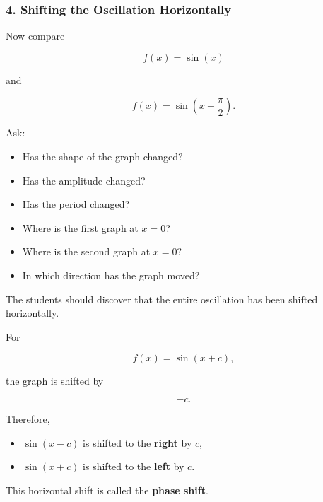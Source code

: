 \documentclass[a4paper,11pt]{article}
\begin{document}
\subsubsection*{4. Shifting the Oscillation Horizontally}

Now compare

\begin{equation}
    f(x)=\sin(x)
\end{equation}

and

\begin{equation}
    f(x)=\sin\left(x-\frac{\pi}{2}\right).
\end{equation}

Ask:

\begin{itemize}
    \item Has the shape of the graph changed?
    \item Has the amplitude changed?
    \item Has the period changed?
    \item Where is the first graph at $x=0$?
    \item Where is the second graph at $x=0$?
    \item In which direction has the graph moved?
\end{itemize}

The students should discover that the entire oscillation has been
shifted horizontally.

For

\begin{equation}
    f(x)=\sin(x+c),
\end{equation}

the graph is shifted by

\begin{equation}
    -c.
\end{equation}

Therefore,

\begin{itemize}
    \item $\sin(x-c)$ is shifted to the \textbf{right} by $c$,
    \item $\sin(x+c)$ is shifted to the \textbf{left} by $c$.
\end{itemize}

This horizontal shift is called the \textbf{phase shift}.


\end{document}
